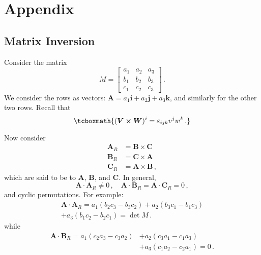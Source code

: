 \section{Appendix}

\subsection{Matrix Inversion}\label{matrix inversion}

Consider the matrix
\begin{equation}
    M = 
    \begin{bmatrix}
    a_1 & a_2 & a_3 \\
    b_1 & b_2 & b_3 \\
    c_1 & c_2 & c_3
    \end{bmatrix}\,.
\end{equation}
We consider the rows as vectors: $\bm{A} = a_1\bm{i} + a_2\bm{j} + a_3\bm{k}$, and similarly for the other two rows. Recall that
\begin{equation}\label{cross product}
    \tcboxmath{(\bm{V \times W})^i = \varepsilon_{ijk}v^jw^k\,.}
\end{equation}

Now consider
\begin{align}
    \bm{A}_R &= \bm{B} \times \bm{C} \\
    \bm{B}_R &= \bm{C} \times \bm{A} \\
    \bm{C}_R &= \bm{A} \times \bm{B}\,,
\end{align}
which are said to be  to $\bm{A}$, $\bm{B}$, and $\bm{C}$. In general, 
\begin{equation}
\bm{A} \cdot \bm{A}_R \neq 0\,, \quad \bm{A} \cdot \bm{B}_R = \bm{A} \cdot \bm{C}_R = 0\,,
\end{equation}
and cyclic permutations. For example:
\begin{multline}
    \bm{A} \cdot \bm{A}_R = a_1(b_2c_3 - b_3c_2) + a_2(b_3c_1 - b_1c_3) \\
    + a_3(b_1c_2 - b_2c_1) = \det M\,.
\end{multline}
while 
\begin{align}
    \bm{A} \cdot \bm{B}_R = a_1(c_2a_3 - c_3a_2) &+ a_2(c_3a_1 - c_1a_3) \\
    &+ a_3(c_1a_2 - c_2a_1) = 0\,.
\end{align}

